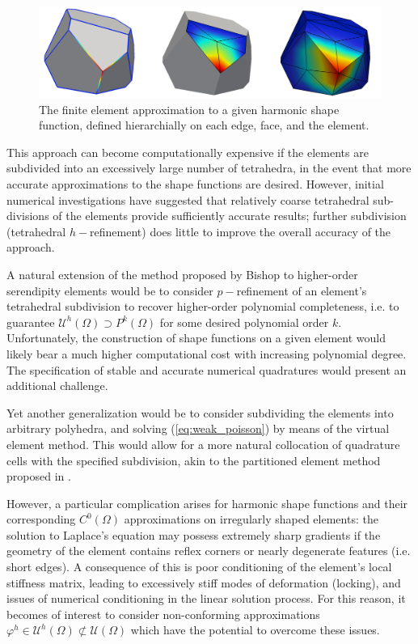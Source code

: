 \begin{figure} [!ht]
	\centering
	\includegraphics[width = 6.0in]{figures/harmonic_fem_sfs.pdf}
	\caption{The finite element approximation to a given harmonic shape function, defined hierarchially on each edge, face, and the element.}
	\label{fig:harmonic_fem_sfs}
\end{figure}
	
	This approach can become computationally expensive if the elements are subdivided into an excessively large number of tetrahedra, in the event that more accurate approximations to the shape functions are desired. However, initial numerical investigations have suggested that relatively coarse tetrahedral sub-divisions of the elements provide sufficiently accurate results; further subdivision (tetrahedral $h-$refinement) does little to improve the overall accuracy of the approach.
	
	A natural extension of the method proposed by Bishop to higher-order serendipity elements would be to consider $p-$refinement of an element's tetrahedral subdivision to recover higher-order polynomial completeness, i.e. to guarantee $\mathcal{U}^h (\Omega) \supset P^k (\Omega)$ for some desired polynomial order $k$. Unfortunately, the construction of shape functions on a given element would likely bear a much higher computational cost with increasing polynomial degree. The specification of stable and accurate numerical quadratures would present an additional challenge.
	
	Yet another generalization would be to consider subdividing the elements into arbitrary polyhedra, and solving (\ref{eq:weak_poisson}) by means of the virtual element method. This would allow for a more natural collocation of quadrature cells with the specified subdivision, akin to the partitioned element method proposed in \cite{Rashid:12}.
	
	However, a particular complication arises for harmonic shape functions and their corresponding $C^0 (\Omega)$ approximations on irregularly shaped elements: the solution to Laplace's equation may possess extremely sharp gradients if the geometry of the element contains reflex corners or nearly degenerate features (i.e. short edges). A consequence of this is poor conditioning of the element's local stiffness matrix, leading to excessively stiff modes of deformation (locking), and issues of numerical conditioning in the linear solution process. For this reason, it becomes of interest to consider non-conforming approximations $\varphi^h \in \mathcal{U}^h (\Omega) \not\subset \mathcal{U} (\Omega)$ which have the potential to overcome these issues.
	
